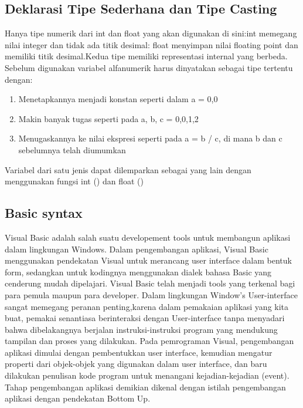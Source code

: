 \subsection{Deklarasi Tipe Sederhana dan Tipe Casting}
    Hanya tipe numerik dari int dan float yang akan digunakan di sini:int memegang nilai integer dan tidak ada titik desimal: 
    float menyimpan nilai floating point dan memiliki titik desimal.Kedua tipe memiliki representasi internal yang berbeda. 
    Sebelum digunakan variabel alfanumerik harus dinyatakan sebagai tipe tertentu dengan:
\begin{enumerate}
    \item Menetapkannya menjadi konstan seperti dalam a = 0,0
    \item Makin banyak tugas seperti pada a, b, c = 0,0,1,2
    \item Menugaskannya ke nilai ekspresi seperti pada a = b / c, di mana b dan c sebelumnya telah diumumkan
 \end{enumerate}
Variabel dari satu jenis dapat dilemparkan sebagai yang lain dengan menggunakan fungsi int () dan float () \cite{gray2017snake}

\subsection {Basic syntax}
Visual Basic adalah salah suatu developement tools untuk membangun aplikasi dalam lingkungan Windows. Dalam pengembangan aplikasi, Visual Basic menggunakan pendekatan Visual untuk merancang user interface dalam bentuk form, sedangkan untuk kodingnya menggunakan dialek bahasa Basic yang cenderung mudah dipelajari. Visual Basic telah menjadi tools yang terkenal bagi para pemula maupun para developer. Dalam lingkungan Window’s User-interface sangat memegang peranan penting,karena dalam pemakaian aplikasi yang kita buat, pemakai senantiasa berinteraksi dengan User-interface tanpa menyadari bahwa dibelakangnya berjalan instruksi-instruksi program yang mendukung tampilan dan proses yang dilakukan.
Pada pemrograman Visual, pengembangan aplikasi dimulai dengan pembentukkan user interface, kemudian mengatur properti dari objek-objek yang digunakan dalam user interface, dan baru dilakukan penulisan kode program untuk menangani kejadian-kejadian (event). Tahap pengembangan aplikasi demikian dikenal dengan istilah pengembangan aplikasi dengan pendekatan Bottom Up.
